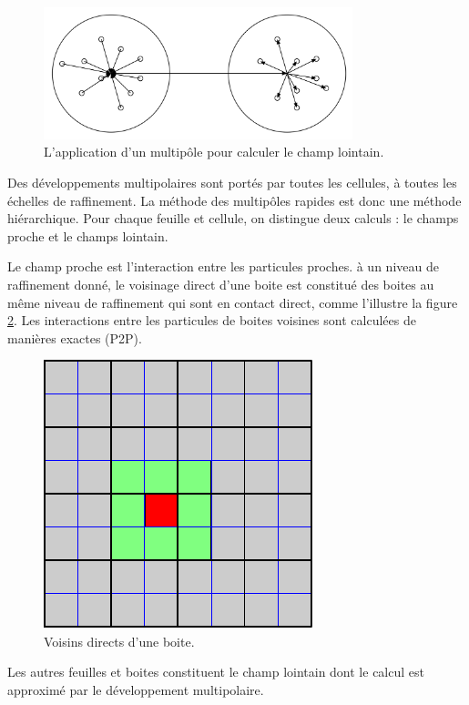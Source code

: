 \documentclass[11pt,class=article,float=false,crop=false]{standalone}
\begin{document}
\begin{figure}[H]
	\centering
	\includegraphics[width=0.8\textwidth]{img/fmm-multipole}
	\caption{L'application d'un multipôle pour calculer le champ lointain.}
	\label{fig:fmm:multipole}
\end{figure}

Des développements multipolaires sont portés par toutes les cellules, à toutes les échelles de raffinement. La méthode des multipôles rapides est donc une méthode hiérarchique. Pour chaque feuille et cellule, on distingue deux calculs : le champs proche et le champs lointain. 

Le champ proche est l'interaction entre les particules proches. à un niveau de raffinement donné, le voisinage direct d'une boite est constitué des boites au même niveau de raffinement qui sont en contact direct, comme l'illustre la figure \ref{fig:fmm:voisin}. Les interactions entre les particules de boites voisines sont calculées de manières exactes (P2P).

\begin{figure}[H]
	\centering
	\includegraphics[height=0.2\textheight]{img/fmm-voisins}	
	\caption{Voisins directs d'une boite.}
	\label{fig:fmm:voisin}
\end{figure}

Les autres feuilles et boites constituent le champ lointain dont le calcul est approximé par le développement multipolaire.
\end{document}
